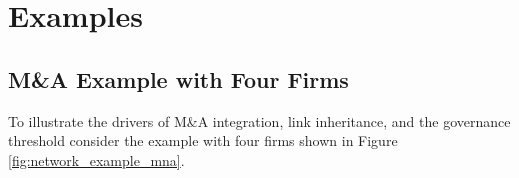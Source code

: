 \section{Examples}
\label{sec:examples}

\subsection{M\&A Example with Four Firms}
\label{sec:mna-example}
To illustrate the drivers of M\&A integration, link inheritance, and the governance threshold consider the example with four firms shown in Figure \ref{fig:network_example_mna}. 
